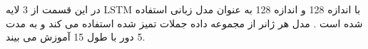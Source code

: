 \section{}
در این قسمت از 3 لایه
LSTM
با اندازه 128 و اندازه
128 به عنوان مدل زبانی استفاده شده است \cite{Ref3}. مدل هر ژانر از مجموعه داده جملات تمیز شده استفاده می کند و به مدت 5 دور با طول
15 آموزش می بیند. 